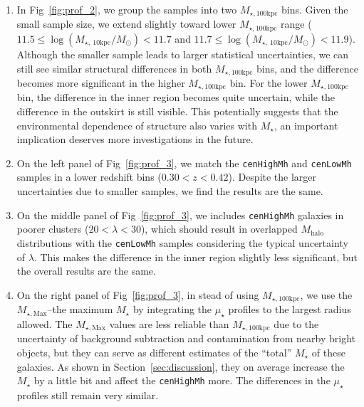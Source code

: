 \documentclass[a4paper,fleqn,usenatbib]{mnras}
\def\rbcg{\texttt{cenHighMh}}
\def\nbcg{\texttt{cenLowMh}}
\def\mstar{{$M_{\star}$}}
\def\mhalo{{$M_{\mathrm{halo}}$}}
\def\mtot{{$M_{\star,100\mathrm{kpc}}$}}
\def\mmax{{$M_{\star,\mathrm{Max}}$}}
\def\mden{{$\mu_{\star}$}}
\begin{document}
    \begin{enumerate}
        
        \item In Fig~\ref{fig:prof_2}, we group the samples into two \mtot{} bins. 
            Given the small sample size, we extend slightly toward lower \mtot{} range 
            ($11.5 \leq \log (M_{\star,\ 10\mathrm{kpc}}/M_{\odot}) < 11.7$ and 
             $11.7 \leq \log (M_{\star,\ 10\mathrm{kpc}}/M_{\odot}) < 11.9$). 
            Although the smaller sample leads to larger statistical uncertainties, 
            we can still see similar structural differences in both \mtot{} bins, 
            and the difference becomes more significant in the higher \mtot{} bin.  
            For the lower \mtot{} bin, the difference in the inner region becomes 
            quite uncertain, while the difference in the outskirt is still visible. 
            This potentially suggests that the environmental dependence of structure 
            also varies with \mstar{}, an important implication deserves more 
            investigations in the future.   

        \item On the left panel of Fig~\ref{fig:prof_3}, we match the \rbcg{} and 
            \nbcg{} samples in a lower redshift bins ($0.30 < z < 0.42$).
            Despite the larger uncertainties due to smaller samples, we find the 
            results are the same.
            
        \item On the middle panel of Fig~\ref{fig:prof_3}, we includes \rbcg{} 
            galaxies in poorer clusters ($20 < \lambda < 30$), which should result 
            in overlapped \mhalo{} distributions with the \nbcg{} samples 
            considering the typical uncertainty of $\lambda$.
            This makes the difference in the inner region slightly less significant, 
            but the overall results are the same. 
             
        \item On the right panel of Fig~\ref{fig:prof_3}, in stead of using \mtot{}, 
            we use the \mmax{}--the maximum \mstar{} by integrating the \mden{} 
            profiles to the largest radius allowed.  
            The \mmax{} values are less reliable than \mtot{} due to the 
            uncertainty of background subtraction and contamination from nearby 
            bright objects, but they can serve as different estimates of the ``total''
            \mstar{} of these galaxies.
            As shown in Section~\ref{sec:discussion}, they on average increase
            the \mstar{} by a little bit and affect the \rbcg{} more.
            The differences in the \mden{} profiles still remain very similar.
      
    \end{enumerate}
    
\end{document}
